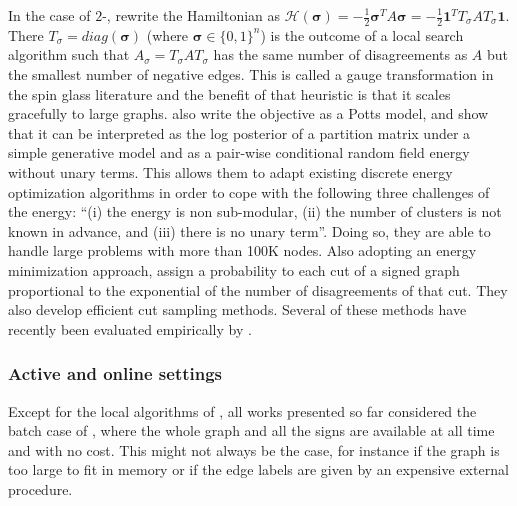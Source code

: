 In the case of $2$-\pcc{}, \textcite{Facchetti2011isingmodel} rewrite the Hamiltonian as
$\mathcal{H}(\bm{\sigma}) = -\frac{1}{2}\bm{\sigma}^T A \bm{\sigma} = -\frac{1}{2}\bm{1}^TT_\sigma A
T_\sigma\bm{1}$. There $T_\sigma = diag(\bm{\sigma})$ (where $\bm{\sigma} \in \{0,1\}^n$) is the
outcome of a local search algorithm such that $A_\sigma = T_\sigma A T_\sigma$ has the same number
of disagreements as $A$ but the smallest number of negative edges. This is called a gauge
transformation in the spin glass literature and the benefit of that heuristic is that it scales
gracefully to large graphs.
\Textcite{Bagon2011} also write the \maxa{} objective as a Potts model, and show that it can be
interpreted as the log posterior of a partition matrix under a simple generative model and as a
pair-wise conditional random field energy without unary terms. This allows them to adapt existing
discrete energy optimization algorithms in order to cope with the following three challenges of the
\pcc{} energy: \enquote{(i) the energy is non sub-modular, (ii) the number of clusters is not known
in advance, and (iii) there is no unary term}. Doing so, they are able to handle large problems with
more than 100K nodes.  Also adopting an energy minimization approach, \textcite{Kappes2016} assign a
probability to each cut of a signed graph proportional to the exponential of the number of
disagreements of that cut. They also develop efficient cut sampling methods. Several of these
methods have recently been evaluated empirically by \textcite{energyCCBench17}.



\subsubsection{Active and online settings}

Except for the local algorithms of \textcite{Bonchi2013}, all works presented so far considered the
batch case of \pcc{}, where the whole graph and all the signs are available at all time and with no
cost. This might not always be the case, for instance if the graph is too large to fit in memory or
if the edge labels are given by an expensive external procedure.

